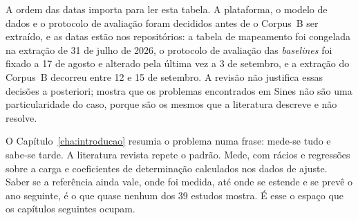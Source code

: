 A ordem das datas importa para ler esta tabela. A plataforma, o modelo de
dados e o protocolo de avaliação foram decididos antes de o Corpus~B ser
extraído, e as datas estão nos repositórios: a tabela de mapeamento foi
congelada na extração de 31 de julho de 2026, o protocolo de avaliação das
\emph{baselines} foi fixado a 17 de agosto e alterado pela última vez a 3 de
setembro, e a extração do Corpus~B decorreu entre 12 e 15 de setembro. A revisão não justifica essas decisões a posteriori; mostra que os
problemas encontrados em Sines não são uma particularidade do caso, porque
são os mesmos que a literatura descreve e não resolve.

O Capítulo~\ref{cha:introducao} resumia o problema numa frase: mede-se tudo e
sabe-se tarde. A literatura revista repete o padrão. Mede, com rácios e
regressões sobre a carga e coeficientes de determinação calculados nos dados
de ajuste. Saber se a referência ainda vale, onde foi medida, até onde se
estende e se prevê o ano seguinte, é o que quase nenhum dos 39 estudos mostra.
É esse o espaço que os capítulos seguintes ocupam.
